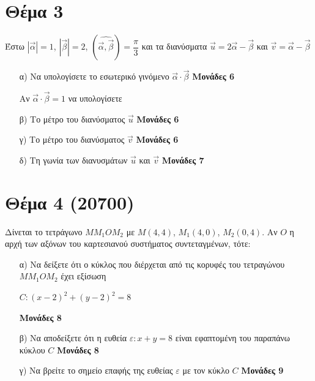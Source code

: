 \documentclass[12pt]{extarticle}
\begin{document}
\section*{Θέμα 3}
\noindent
Έστω $|\vec{α}|=1$, $|\vec{β}|=2$, $(\widehat{\vec{α},\vec{β}})=\dfrac{π}{3}$ και τα διανύσματα $\vec{u}=2\vec{α}-\vec{β}$ και $\vec{v}=\vec{α}-\vec{β}$
\begin{enumerate}
    \item[α)] Να υπολογίσετε το εσωτερικό γινόμενο $\vec{α}\cdot \vec{β}$ \hspace*{\fill} \textbf{Μονάδες 6}

        Αν $\vec{α}\cdot \vec{β}=1$ να υπολογίσετε

    \item[β)] Το μέτρο του διανύσματος $\vec{u}$ \hspace*{\fill} \textbf{Μονάδες 6}
    \item[γ)] Το μέτρο του διανύσματος $\vec{v}$ \hspace*{\fill} \textbf{Μονάδες 6}
    \item[δ)] Τη γωνία των διανυσμάτων $\vec{u}$ και $\vec{v}$ \hspace*{\fill} \textbf{Μονάδες 7}
\end{enumerate}

\section*{Θέμα 4 (20700)}
\noindent

Δίνεται το τετράγωνο $ΜΜ_1ΟΜ_2$ με $Μ(4,4)$, $Μ_1(4,0)$, $Μ_2(0,4)$. Αν $Ο$ η αρχή των αξόνων του καρτεσιανού συστήματος συντεταγμένων, τότε:
\begin{enumerate}
    \item[α)] Να δείξετε ότι ο κύκλος που διέρχεται από τις κορυφές του τετραγώνου $ΜΜ_1ΟΜ_2$ έχει εξίσωση

        $C:(x-2)^2+(y-2)^2=8$

        \hspace*{\fill} \textbf{Μονάδες 8}
    \item[β)] Να αποδείξετε ότι η ευθεία $ε:x+y=8$ είναι εφαπτομένη του παραπάνω κύκλου $C$ \hspace*{\fill} \textbf{Μονάδες 8}
    \item[γ)] Να βρείτε το σημείο επαφής της ευθείας $ε$ με τον κύκλο $C$ \hspace*{\fill} \textbf{Μονάδες 9}
\end{enumerate}
\end{document}
